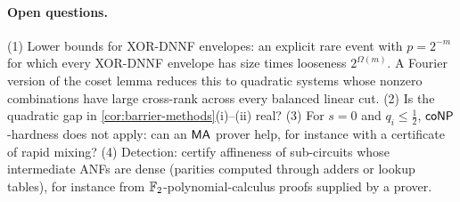 \paragraph{Open questions.} (1) Lower bounds for XOR-DNNF envelopes: an explicit
rare event with $p=2^{-m}$ for which every XOR-DNNF envelope has size times
looseness $2^{\Omega(m)}$. A Fourier version of the coset lemma reduces this to
quadratic systems whose nonzero combinations have large cross-rank across every
balanced linear cut. (2) Is the quadratic gap in \cref{cor:barrier-methods}(i)--(ii)
real? (3) For $s=0$ and $q_i\le\frac12$, $\mathsf{coNP}$-hardness does not apply: can an
$\mathsf{MA}$ prover help, for instance with a certificate of rapid mixing? (4) Detection:
certify affineness of sub-circuits whose intermediate ANFs are dense (parities
computed through adders or lookup tables), for instance from $\mathbb{F}_2$-polynomial-calculus
proofs supplied by a prover.
